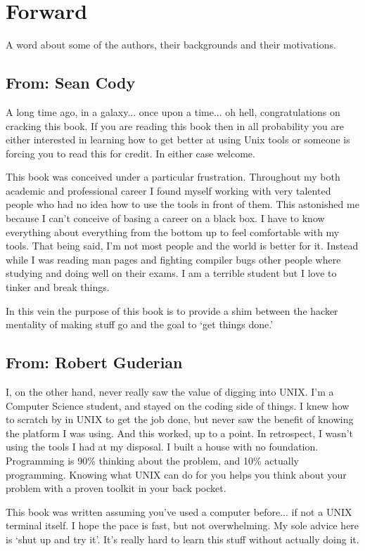 \chapter{Forward}

A word about some of the authors, their backgrounds and their motivations.

\section{From: Sean Cody}
A long time ago, in a galaxy... once upon a time... oh hell, congratulations on cracking this book. 
 If you are reading this book then in all probability you
are either interested in learning how to get better at using Unix tools or 
someone is forcing you to read this for credit.  In either case welcome.

This book was conceived under a particular frustration.  Throughout my
both academic and professional career I found myself working with very talented
people who had no idea how to use the tools in front of them.  This astonished
me because I can't conceive of basing a career on a black box.  I have to know
everything about everything from the bottom up to feel comfortable with my 
tools.  That being said, I'm not most people and the world is better for it.  
Instead while I was reading man pages and fighting compiler bugs other people 
where studying and doing well on their exams.  I am a terrible student but 
I love to tinker and break things.

In this vein the purpose of this book is to provide a shim between the hacker
mentality of making stuff go and the goal to `get things done.'

\section{From: Robert Guderian}

I, on the other hand, never really saw the value of digging into UNIX. I'm
a Computer Science student, and stayed on the coding side of things. 
I knew how to scratch by in UNIX to get the job done, but never saw
the benefit of knowing the platform I was using. And this worked, up to a point.
In retrospect, I wasn't using the tools I had at my disposal. I built a 
house with no foundation. Programming is 90\% thinking about the problem, and 10\%  actually
programming. Knowing what UNIX can do for you helps you think about your problem with a
proven toolkit in your back pocket.

This book was written assuming you've used a computer before... if not a UNIX terminal itself. 
I hope the pace is fast, but not overwhelming. My sole advice here is `shut up and try it'. 
It's really hard to learn this stuff without actually doing it.
